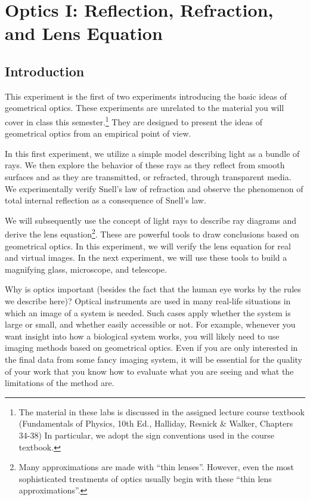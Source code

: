 \chapter{Optics I: Reflection, Refraction, and Lens Equation}

\section{Introduction}

This experiment is the first of two experiments introducing the basic ideas of geometrical optics.  These experiments are unrelated to the material you will cover in class this semester.\footnote{The material in these labs is discussed in the assigned lecture course textbook (Fundamentals of Physics, 10th Ed., Halliday, Resnick \& Walker, Chapters 34-38) In particular, we adopt the sign conventions used in the course textbook.}  They are designed to present the ideas of geometrical optics from an empirical point of view.\myskip

In this first experiment, we utilize a simple model describing light as a bundle of rays.  We then explore the behavior of these rays as they reflect from smooth surfaces and as they are transmitted, or refracted, through transparent media.  We experimentally verify Snell's law of refraction and observe the phenomenon of total internal reflection as a consequence of Snell's law.\myskip

We will subsequently use the concept of light rays to describe ray diagrams and derive the lens equation\footnote{Many approximations are made with ``thin lenses''. However, even the most sophisticated treatments of optics usually begin with these ``thin lens approximations''.}. These are powerful tools to draw conclusions based on geometrical optics. In this experiment, we will verify the lens equation for real and virtual images. In the next experiment, we will use these tools to build a magnifying glass, microscope, and telescope.\myskip

Why is optics important (besides the fact that the human eye works by the rules we describe here)? Optical instruments are used in many real-life situations in which an image of a system is needed.  Such cases apply whether the system is large or small, and whether easily accessible or not.  For example, whenever you want insight into how a biological system works, you will likely need to use imaging methods based on geometrical optics. Even if you are only interested in the final data from some fancy imaging system, it will be essential for the quality of your work that you know how to evaluate what you are seeing and what the limitations of the method are.\myskip

